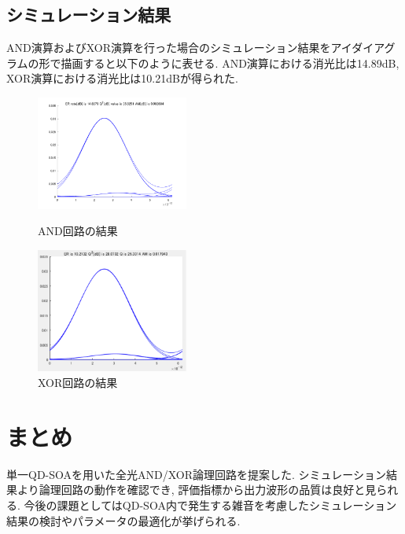 \documentclass[dvipdfmx]{ujarticle}
\begin{document}
\subsection{シミュレーション結果}
AND演算およびXOR演算を行った場合のシミュレーション結果をアイダイアグラムの形で描画すると以下のように表せる.
AND演算における消光比は14.89dB, XOR演算における消光比は10.21dBが得られた.

\begin{figure}[h]
  \begin{center}
    \includegraphics[width=5cm]{images/and_result.png}
    \caption{AND回路の結果}
  \end{center}
  \begin{center}
    \includegraphics[width=5cm]{images/xor_result.png}
    \caption{XOR回路の結果}
  \end{center}
\end{figure}

\section{まとめ}
単一QD-SOAを用いた全光AND/XOR論理回路を提案した.
シミュレーション結果より論理回路の動作を確認でき, 評価指標から出力波形の品質は良好と見られる.
今後の課題としてはQD-SOA内で発生する雑音を考慮したシミュレーション結果の検討やパラメータの最適化が挙げられる.
\end{document}
